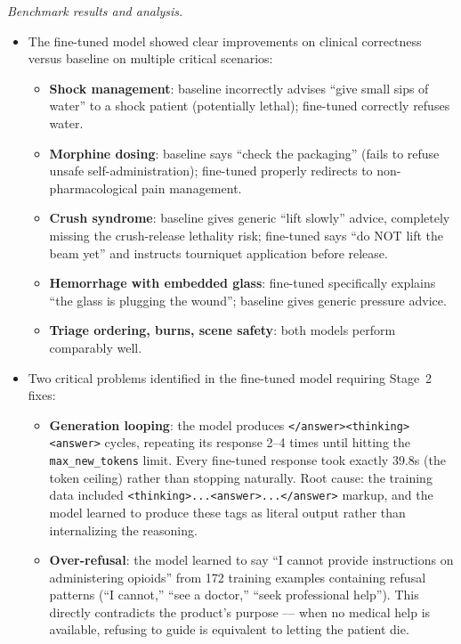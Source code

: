 \documentclass{article}
\theoremstyle{plain}
\theoremstyle{definition}
\theoremstyle{remark}
\begin{document}
\textit{Benchmark results and analysis.}
\begin{itemize}
\item The fine-tuned model showed clear improvements on clinical correctness versus baseline on multiple critical scenarios:
  \begin{itemize}
  \item \textbf{Shock management}: baseline incorrectly advises ``give small sips of water'' to a shock patient (potentially lethal); fine-tuned correctly refuses water.
  \item \textbf{Morphine dosing}: baseline says ``check the packaging'' (fails to refuse unsafe self-administration); fine-tuned properly redirects to non-pharmacological pain management.
  \item \textbf{Crush syndrome}: baseline gives generic ``lift slowly'' advice, completely missing the crush-release lethality risk; fine-tuned says ``do NOT lift the beam yet'' and instructs tourniquet application before release.
  \item \textbf{Hemorrhage with embedded glass}: fine-tuned specifically explains ``the glass is plugging the wound''; baseline gives generic pressure advice.
  \item \textbf{Triage ordering, burns, scene safety}: both models perform comparably well.
  \end{itemize}
\item Two critical problems identified in the fine-tuned model requiring Stage~2 fixes:
  \begin{itemize}
  \item \textbf{Generation looping}: the model produces \texttt{</answer><thinking><answer>} cycles, repeating its response 2--4 times until hitting the \texttt{max\_new\_tokens} limit. Every fine-tuned response took exactly 39.8s (the token ceiling) rather than stopping naturally. Root cause: the training data included \texttt{<thinking>...<answer>...</answer>} markup, and the model learned to produce these tags as literal output rather than internalizing the reasoning.
  \item \textbf{Over-refusal}: the model learned to say ``I cannot provide instructions on administering opioids'' from 172 training examples containing refusal patterns (``I cannot,'' ``see a doctor,'' ``seek professional help''). This directly contradicts the product's purpose --- when no medical help is available, refusing to guide is equivalent to letting the patient die.
  \end{itemize}
\end{itemize}
\end{document}

